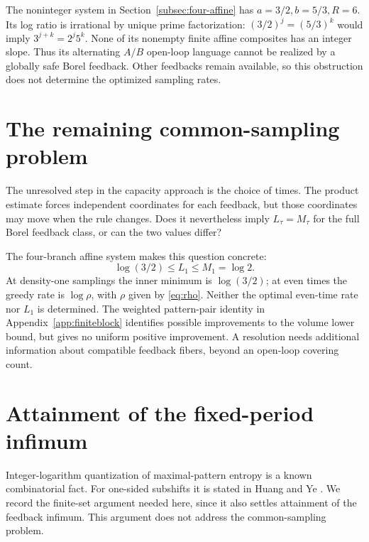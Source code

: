\documentclass[11pt,reqno]{amsart}
\numberwithin{equation}{section}
\theoremstyle{definition}
\theoremstyle{definition}
\begin{document}
The noninteger system in Section~\ref{subsec:four-affine} has
$a=3/2,b=5/3,R=6$. Its log ratio is irrational by unique prime
factorization: $(3/2)^j=(5/3)^k$ would imply
$3^{j+k}=2^j5^k$. None of its nonempty finite affine composites
has an integer slope. Thus its alternating $A/B$ open-loop language
cannot be realized by a globally safe Borel feedback. Other feedbacks
remain available, so this obstruction does not determine the optimized
sampling rates.

\section{The remaining common-sampling problem}\label{app:scope}
The unresolved step in the capacity approach is the choice of times.
The product estimate forces independent coordinates for each
feedback, but those coordinates may move when the rule changes.
Does it nevertheless imply $L_\tau=M_\tau$ for the full Borel
feedback class, or can the two values differ?

The four-branch affine system makes this question concrete:
\[
 \log(3/2)\le L_1\le M_1=\log2.
\]
At density-one samplings the inner minimum is $\log(3/2)$; at even
times the greedy rate is $\log\rho$, with $\rho$ given by
\eqref{eq:rho}. Neither the optimal even-time rate nor $L_1$ is
determined. The weighted pattern-pair identity in
Appendix~\ref{app:finiteblock} identifies possible improvements to
the volume lower bound, but gives no uniform positive improvement.
A resolution needs additional information about compatible feedback
fibers, beyond an open-loop covering count.

\appendix

\section{Attainment of the fixed-period infimum}\label{app:minimum}

Integer-logarithm quantization of maximal-pattern entropy is a known
combinatorial fact. For one-sided subshifts it is stated in
Huang and Ye \cite[Theorem~5.5]{HuangYe2009}. We record the finite-set
argument needed here, since it also settles attainment of the feedback
infimum. This argument does not address the common-sampling problem.
\end{document}
